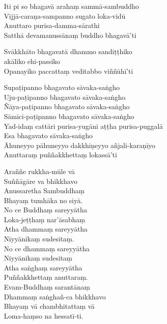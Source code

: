 \begin{paritta}

Iti pi so bhagavā arahaṃ sammā-sambuddho\\
Vijjā-caraṇa-sampanno sugato loka-vidū\\
Anuttaro purisa-damma-sārathi\\
Satthā devamanussānaṃ buddho bhagavā'ti

Svākkhāto bhagavatā dhammo sandiṭṭhiko\\
\vin akāliko ehi-passiko\\
Opanayiko paccattaṃ veditabbo viññūhī'ti

Supaṭipanno bhagavato sāvaka-saṅgho\\
Uju-paṭipanno bhagavato sāvaka-saṅgho\\
Ñāya-paṭipanno bhagavato sāvaka-saṅgho\\
Sāmīci-paṭipanno bhagavato sāvaka-saṅgho\\
Yad-idaṃ cattāri purisa-yugāni aṭṭha purisa-puggalā\\
Esa bhagavato sāvaka-saṅgho\\
Āhuneyyo pāhuneyyo dakkhiṇeyyo añjali-karaṇīyo\\
Anuttaraṃ puññakkhettaṃ lokassā'ti


\sidepar{\pointerMark}%
Araññe rukkha-mūle vā\\
Suññāgāre va bhikkhavo\\
Anussaretha Sambuddhaṃ\\
Bhayaṃ tumhāka no siyā.\\
No ce Buddhaṃ sareyyātha\\
Loka-jeṭṭhaṃ nar'āsabhaṃ\\
Atha dhammaṃ sareyyātha\\
Niyyānikaṃ sudesitaṃ.\\
No ce dhammaṃ sareyyātha\\
Niyyānikaṃ sudesitaṃ\\
Atha saṅghaṃ sareyyātha\\
Puññakkhettaṃ anuttaraṃ.\\
Evam-Buddhaṃ sarantānaṃ\\
Dhammaṃ saṅghañ-ca bhikkhavo\\
Bhayaṃ vā chambhitattaṃ vā\\
Loma-haṃso na hessatī-ti.


\end{paritta}

